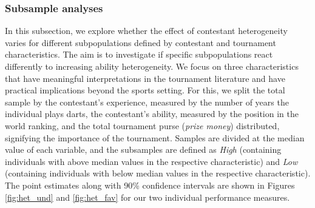 \documentclass[11pt,a4paper]{article}
\begin{document}
\subsubsection{Subsample analyses} \label{subsubsec:het}
In this subsection, we explore whether the effect of contestant heterogeneity varies for different subpopulations defined by contestant and tournament characteristics. The aim is to investigate if specific subpopulations react differently to increasing ability heterogeneity. We focus on three characteristics that have meaningful interpretations in the tournament literature and have practical implications beyond the sports setting.  For this, we split the total sample by the contestant's experience, measured by the number of years the individual plays darts, the contestant's ability, measured by the position in the world ranking, and the total tournament purse (\textit{prize money}) distributed, signifying the importance of the tournament.
Samples are divided at the median value of each variable, and the subsamples are defined as \textit{High} (containing individuals with above median values in the respective characteristic) and \textit{Low} (containing individuals with below median values in the respective characteristic). The point estimates along with 90\% confidence intervals are shown in Figures \ref{fig:het_und} and \ref{fig:het_fav} for our two individual performance measures.\par
\end{document}
